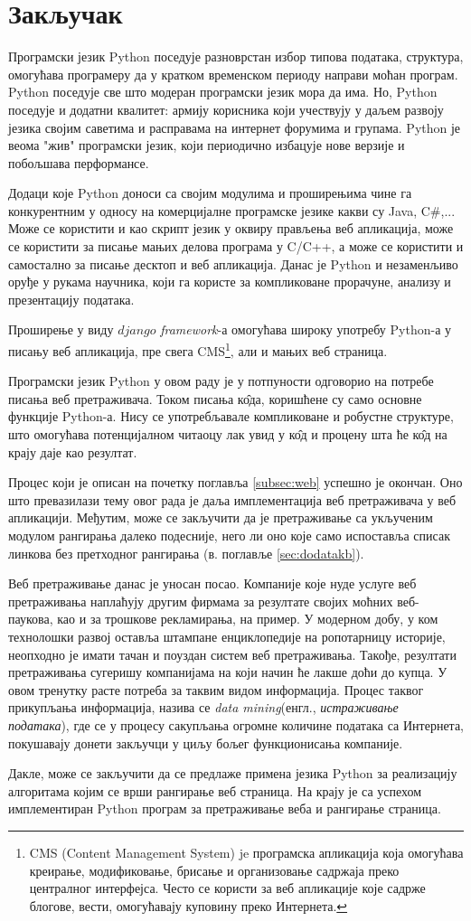 \section{Закључак}

Програмски језик Python поседује разноврстан избор типова података, структура, омогућава програмеру да у кратком временском периоду направи моћан програм. Python поседује све што модеран програмски језик мора да има. Но, Python поседује  и додатни квалитет: армију корисника који учествују у даљем развоју језика својим саветима и расправама на интернет форумима и групама. Python је веома "жив" програмски језик, који периодично избацује нове верзије и побољшава перформансе. 

Додаци које Python доноси са својим модулима и проширењима чине га конкурентним у односу на комерцијалне програмске језике какви су Java, C\#,... Може се користити и као скрипт језик у оквиру прављења веб апликација, може се користити за писање мањих делова програма у C/C++, а може се користити и самостално за писање десктоп и веб апликација. Данас је Python и незаменљиво оруђе у рукама научника, који га користе за компликоване прорачуне, анализу и презентацију података. 

Проширење у виду $django$ \emph{framework}-а\cite{django} омогућава широку употребу Python-а у писању веб апликација, пре свега CMS\footnote{CMS (Content Management System) je програмска апликација која омогућава креирање, модификовање, брисање и организовање садржаја преко централног интерфејса. Често се користи за веб апликације које садрже блогове, вести, омогућавају куповину преко Интернета.}, али и мањих веб страница. 

Програмски језик Python у овом раду је у потпуности одговорио на потребе писања веб претраживача. Током писања к\^{о}да, коришћене су само основне функције Python-а. Нису се употребљавале компликоване и робустне структуре, што омогућава потенцијалном читаоцу лак увид у к\^{о}д и процену шта ће к\^{о}д на крају даје као резултат.

Процес који је описан на почетку поглавља \ref{subsec:web} успешно је окончан. Оно што превазилази тему овог рада је даља имплементација веб претраживача у веб апликацији. Међутим, може се закључити да је претраживање са укљученим модулом рангирања далеко подесније, него ли оно које само испоставља списак линкова без претходног рангирања (в. поглавље \ref{sec:dodatakb}). 

Веб претраживање данас је уносан посао. Компаније које нуде услуге веб претраживања наплаћују другим фирмама за резултате својих моћних веб-паукова, као и за трошкове рекламирања, на пример. У модерном добу, у ком технолошки развој оставља штампане енциклопедије на ропотарницу историје, неопходно је имати тачан и поуздан систем веб претраживања. Такође, резултати претраживања сугеришу компанијама на који начин ће лакше доћи до купца. У овом тренутку расте потреба за таквим видом информација. Процес таквог прикупљања информација, назива се \emph{data mining}(енгл., \emph{истраживање података}), где се у процесу сакупљања огромне количине података са Интернета, покушавају донети закључци у циљу бољег функционисања компаније.

Дакле, може се закључити да се предлаже примена језика Python за реализацију алгоритама којим се врши рангирање веб страница. На крају је са успехом имплементиран Python програм за претраживање веба и рангирање страница.
